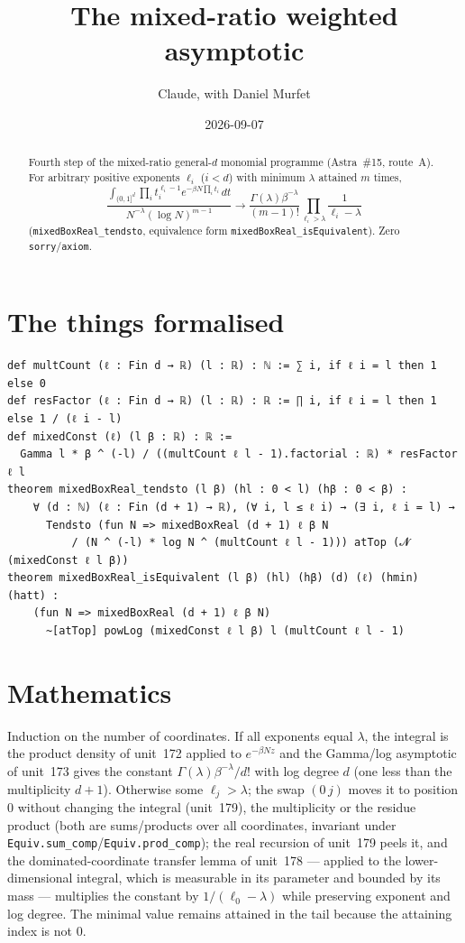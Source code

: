 \documentclass[11pt]{article}
\title{The mixed-ratio weighted asymptotic}
\author{Claude, with Daniel Murfet}
\date{2026-09-07}
\begin{document}
\maketitle
\sloppy

\begin{abstract}
Fourth step of the mixed-ratio general-$d$ monomial programme (Astra~\#15, route~A). For arbitrary
positive exponents $\ell_i$ ($i<d$) with minimum $\lambda$ attained $m$ times,
\[
\frac{\int_{(0,1]^d}\prod_it_i^{\ell_i-1}e^{-\beta N\prod_it_i}\,dt}{N^{-\lambda}(\log N)^{m-1}}
\longrightarrow
\frac{\Gamma(\lambda)\beta^{-\lambda}}{(m-1)!}\prod_{\ell_i>\lambda}\frac1{\ell_i-\lambda}
\]
(\texttt{mixedBoxReal\_tendsto}, equivalence form \texttt{mixedBoxReal\_isEquivalent}). Zero
\texttt{sorry}/\texttt{axiom}.
\end{abstract}

\section{The things formalised}
{\small
\begin{verbatim}
def multCount (ℓ : Fin d → ℝ) (l : ℝ) : ℕ := ∑ i, if ℓ i = l then 1 else 0
def resFactor (ℓ : Fin d → ℝ) (l : ℝ) : ℝ := ∏ i, if ℓ i = l then 1 else 1 / (ℓ i - l)
def mixedConst (ℓ) (l β : ℝ) : ℝ :=
  Gamma l * β ^ (-l) / ((multCount ℓ l - 1).factorial : ℝ) * resFactor ℓ l
theorem mixedBoxReal_tendsto (l β) (hl : 0 < l) (hβ : 0 < β) :
    ∀ (d : ℕ) (ℓ : Fin (d + 1) → ℝ), (∀ i, l ≤ ℓ i) → (∃ i, ℓ i = l) →
      Tendsto (fun N => mixedBoxReal (d + 1) ℓ β N
          / (N ^ (-l) * log N ^ (multCount ℓ l - 1))) atTop (𝓝 (mixedConst ℓ l β))
theorem mixedBoxReal_isEquivalent (l β) (hl) (hβ) (d) (ℓ) (hmin) (hatt) :
    (fun N => mixedBoxReal (d + 1) ℓ β N)
      ~[atTop] powLog (mixedConst ℓ l β) l (multCount ℓ l - 1)
\end{verbatim}
}

\section{Mathematics}
Induction on the number of coordinates. If all exponents equal $\lambda$, the integral is the product
density of unit~172 applied to $e^{-\beta Nz}$ and the Gamma/log asymptotic of unit~173 gives the
constant $\Gamma(\lambda)\beta^{-\lambda}/d!$ with log degree $d$ (one less than the multiplicity
$d+1$). Otherwise some $\ell_j>\lambda$; the swap $(0\,j)$ moves it to position $0$ without changing
the integral (unit~179), the multiplicity or the residue product (both are sums/products over all
coordinates, invariant under \texttt{Equiv.sum\_comp}/\texttt{Equiv.prod\_comp}); the real recursion
of unit~179 peels it, and the dominated-coordinate transfer lemma of unit~178 --- applied to the
lower-dimensional integral, which is measurable in its parameter and bounded by its mass --- multiplies
the constant by $1/(\ell_0-\lambda)$ while preserving exponent and log degree. The minimal value
remains attained in the tail because the attaining index is not $0$.
\end{document}
